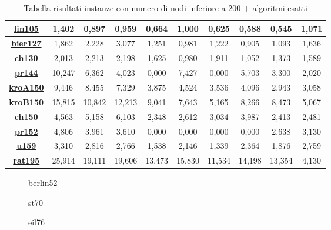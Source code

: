 \documentclass[11pt]{article}
\begin{document}
\begin{table}
\begin{adjustbox}{center}
\begin{tabular}{|c|c|c|c|c|c|c|c|c|c|}
        \hline 
        \textbf{\hyperref[fig:lin105]{lin105}} & 1,402 & 0,897 & 0,959 & 0,664 & 1,000 & 0,625 & 0,588 & 0,545 & 1,071\tabularnewline
        \hline 
        \textbf{\hyperref[fig:bier127]{bier127}} & 1,862 & 2,228 & 3,077 & 1,251 & 0,981 & 1,222 & 0,905 & 1,093 & 1,636\tabularnewline
        \hline 
        \textbf{\hyperref[fig:ch130]{ch130}} & 2,013 & 2,213 & 2,198 & 1,625 & 0,980 & 1,911 & 1,052 & 1,373 & 1,589\tabularnewline
        \hline 
        \textbf{\hyperref[fig:pr144]{pr144}} & 10,247 & 6,362 & 4,023 & 0,000 & 7,427 & 0,000 & 5,703 & 3,300 & 2,020\tabularnewline
        \hline 
        \textbf{\hyperref[fig:kroA150]{kroA150}} & 9,446 & 8,455 & 7,329 & 3,875 & 4,524 & 3,536 & 4,096 & 2,943 & 3,058\tabularnewline
        \hline 
        \textbf{\hyperref[fig:kroB150]{kroB150}} & 15,815 & 10,842 & 12,213 & 9,041 & 7,643 & 5,165 & 8,266 & 8,473 & 5,067\tabularnewline
        \hline 
        \textbf{\hyperref[fig:ch150]{ch150}} & 4,563 & 5,158 & 6,103 & 2,348 & 2,612 & 3,034 & 3,987 & 2,413 & 2,481\tabularnewline
        \hline 
        \textbf{\hyperref[fig:pr152]{pr152}} & 4,806 & 3,961 & 3,610 & 0,000 & 0,000 & 0,000 & 0,000 & 2,638 & 3,130\tabularnewline
        \hline 
        \textbf{\hyperref[fig:u159]{u159}} & 3,310 & 2,816 & 2,766 & 1,538 & 2,146 & 1,339 & 2,364 & 1,876 & 2,759\tabularnewline
        \hline 
        \textbf{\hyperref[fig:rat195]{rat195}} & 25,914 & 19,111 & 19,606 & 13,473 & 15,830 & 11,534 & 14,198 & 13,354 & 4,130\tabularnewline
        \hline 
\end{tabular}
\end{adjustbox}
\caption{Tabella risultati instanze con numero di nodi inferiore a \textbf{$200$} $+$ algoritmi esatti}
\end{table}

\begin{figure}[htbp]
    \centering
    \label{fig:berlin52}
    \caption{berlin52}
\end{figure}

\begin{figure}[htbp]
    \centering
    \label{fig:st70}
    \caption{st70}
\end{figure}

\begin{figure}[htbp]
    \centering
    \label{fig:eil76}
    \caption{eil76}
\end{figure}
\end{document}
